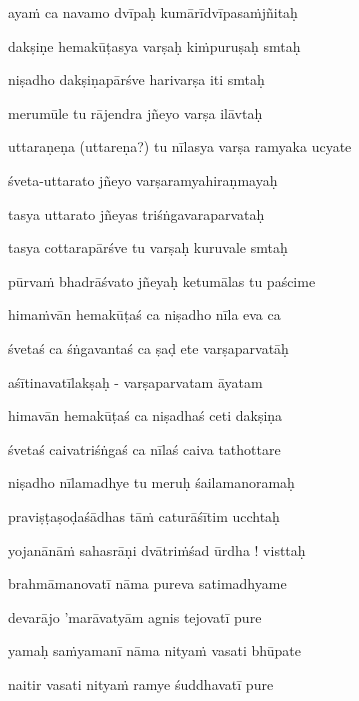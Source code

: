 ayaṁ ca navamo dvīpaḥ kumārīdvīpasaṁjñitaḥ \danda\dontdisplaylinenum

dakṣiṇe hemakūṭasya varṣaḥ kiṁpuruṣaḥ smtaḥ \veg\dontdisplaylinenum
{}

niṣadho dakṣiṇapārśve harivarṣa iti smtaḥ\thinspace{\dandab} \dontdisplaylinenum

merumūle tu rājendra jñeyo varṣa ilāvtaḥ \veg\dontdisplaylinenum

uttaraṇeṇa (uttareṇa?) tu nīlasya varṣa ramyaka ucyate\thinspace{\dandab} \dontdisplaylinenum

śveta-uttarato jñeyo varṣaramyahiraṇmayaḥ \veg\dontdisplaylinenum

tasya uttarato jñeyas triśṅgavaraparvataḥ\thinspace{\dandab} \dontdisplaylinenum

tasya cottarapārśve tu varṣaḥ kuruvale smtaḥ \veg\dontdisplaylinenum

pūrvaṁ bhadrāśvato jñeyaḥ ketumālas tu paścime\thinspace{\dandab} \dontdisplaylinenum

himaṁvān hemakūṭaś ca niṣadho nīla eva ca \veg\dontdisplaylinenum

śvetaś ca śṅgavantaś ca ṣaḍ ete varṣaparvatāḥ\thinspace{\dandab} \dontdisplaylinenum

aśītinavatīlakṣaḥ - varṣaparvatam āyatam \veg\dontdisplaylinenum

himavān hemakūṭaś ca niṣadhaś ceti dakṣiṇa\thinspace{\dandab} \dontdisplaylinenum

śvetaś caivatriśṅgaś ca nīlaś caiva tathottare \veg\dontdisplaylinenum

niṣadho nīlamadhye tu meruḥ śailamanoramaḥ\thinspace{\dandab} \dontdisplaylinenum

praviṣṭaṣoḍaśādhas tāṁ caturāśītim ucchtaḥ \veg\dontdisplaylinenum

yojanānāṁ sahasrāṇi dvātriṁśad ūrdha ! visttaḥ\thinspace{\dandab} \dontdisplaylinenum

brahmāmanovatī nāma pureva satimadhyame \veg\dontdisplaylinenum

devarājo 'marāvatyām agnis tejovatī pure \veg\dontdisplaylinenum

yamaḥ saṁyamanī nāma nityaṁ vasati bhūpate\thinspace{\dandab} \dontdisplaylinenum

naitir vasati nityaṁ ramye śuddhavatī pure \veg\dontdisplaylinenum

